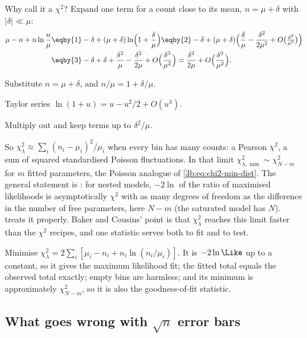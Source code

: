 Why call it a $\chi^2$? Expand one term for a count close to its mean,
$n=\mu+\delta$ with $|\delta|\ll\mu$:
\begin{align*}
  \mu-n+n\ln\frac n\mu
  &\eqby{1}-\delta+(\mu+\delta)\ln\Bigl(1+\frac\delta\mu\Bigr)
  \eqby{2}-\delta+(\mu+\delta)\Bigl(\frac\delta\mu-\frac{\delta^2}{2\mu^2}+O\bigl(\tfrac{\delta^3}{\mu^3}\bigr)\Bigr)\\
  &\eqby{3}-\delta+\delta+\frac{\delta^2}{\mu}-\frac{\delta^2}{2\mu}+O\Bigl(\frac{\delta^3}{\mu^2}\Bigr)
  =\frac{\delta^2}{2\mu}+O\Bigl(\frac{\delta^3}{\mu^2}\Bigr).
\end{align*}
\begin{explain}
  \item Substitute $n=\mu+\delta$, and $n/\mu=1+\delta/\mu$.
  \item Taylor series $\ln(1+u)=u-u^2/2+O(u^3)$.
  \item Multiply out and keep terms up to $\delta^2/\mu$.
\end{explain}
So $\chi^2_\lambda\approx\sum_i(n_i-\mu_i)^2/\mu_i$ when every bin has many
counts: a Pearson $\chi^2$, a sum of squared standardised Poisson
fluctuations. In that limit $\chi^2_{\lambda,\min}\sim\chi^2_{N-m}$ for
$m$ fitted parameters, the Poisson analogue of
\eqref{3b:eq:chi2-min-dist}. The general statement is
 \cite{Wilks1938}: for nested models, $-2\ln$ of the
ratio of maximised likelihoods is asymptotically $\chi^2$ with as many
degrees of freedom as the difference in the number of free parameters,
here $N-m$ (the saturated model has $N$).  treats it properly.
Baker and Cousins' point is that $\chi^2_\lambda$ reaches this limit faster
than the $\chi^2$ recipes, and one statistic serves both to fit and to test.

\begin{keyidea}
Minimise $\chi^2_\lambda=2\sum_i[\mu_i-n_i+n_i\ln(n_i/\mu_i)]$. It is $-2\ln\Like$
up to a constant, so it gives the maximum likelihood fit; the fitted total
equals the observed total exactly; empty bins are harmless; and its minimum
is approximately $\chi^2_{N-m}$, so it is also the goodness-of-fit
statistic.
\end{keyidea}

\subsection{What goes wrong with \texorpdfstring{$\sqrt n$}{sqrt(n)} error bars}
\label{3b:sec:neyman-pearson}

